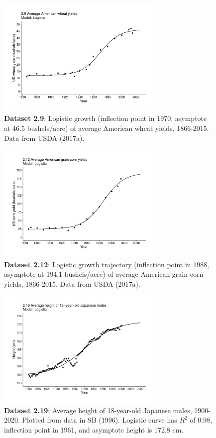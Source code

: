\documentclass[aps,rmp,preprint,superscriptaddress,10pt,onecolumn]{article}
\begin{document}
\begin{figure}[h]
\includegraphics[width=8cm]{output/figs-ggplot/2.9.pdf}
\caption{\textbf{Dataset 2.9}: Logistic growth (inflection point in 1970, asymptote at 46.5 bushels/acre) of average American wheat yields, 1866-2015. Data from USDA (2017a).}
\end{figure}
	
\begin{figure}[h]
\includegraphics[width=8cm]{output/figs-ggplot/2.12.pdf}
\caption{\textbf{Dataset 2.12}: Logistic growth trajectory (inflection point in 1988, asymptote at 194.1 bushels/acre) of average American grain corn yields, 1866-2015. Data from USDA (2017a).}
\end{figure}
	
\begin{figure}[h]
\includegraphics[width=8cm]{output/figs-ggplot/2.19.pdf}
\caption{\textbf{Dataset 2.19}: Average height of 18-year-old Japanese males, 1900-2020. Plotted from data in SB (1996). Logistic curve has $R^2$ of 0.98, inflection point in 1961, and asymptote height is 172.8 cm. }
\end{figure}
	
\end{document}
